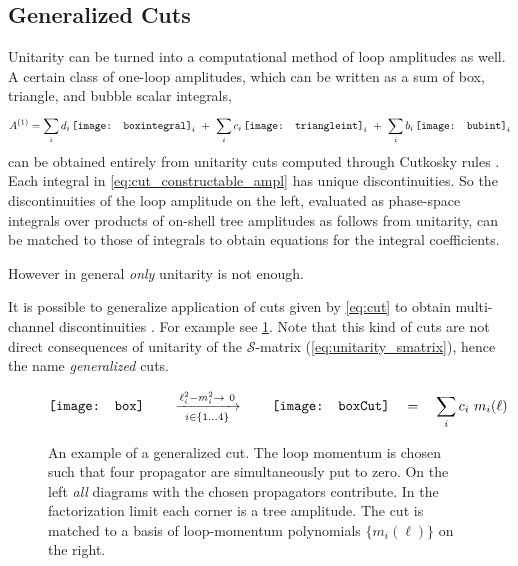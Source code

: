 \subsection{Generalized Cuts}

Unitarity can be turned into a computational method of loop amplitudes as well.
A certain class of one-loop amplitudes, which
can be written as a sum of box, triangle, and bubble scalar integrals,
\begin{equation} \label{eq:cut_constructable_ampl}
  A^{(1)} = \sum_i d_{i}\,\vcenter{\hbox{\texttt{[image: boxintegral]}}}_i~+~
  \sum_{i}^{} c_{i}\,\vcenter{\hbox{\texttt{[image: triangleint]}}}_i~+~
  \sum_i b_{i}\,\vcenter{\hbox{\texttt{[image: bubint]}}}_i
\end{equation}
can be obtained entirely from unitarity cuts computed through Cutkosky rules \cite{Bern:1994cg,Bern:1994zx}.
Each integral in \cref{eq:cut_constructable_ampl} has unique discontinuities.
So the discontinuities of the loop amplitude on the left, 
evaluated as phase-space integrals over products of on-shell tree amplitudes as follows from unitarity,
can be matched to those of integrals to obtain equations for the integral coefficients.

However in general \emph{only} unitarity is not enough.

It is possible to generalize application of cuts given by \cref{eq:cut} to
obtain multi-channel discontinuities \cite{Britto:2004nc}.
For example see \cref{fig:quad_cut}.
Note that this kind of cuts are not direct consequences of unitarity of the $\mathcal{S}$-matrix (\cref{eq:unitarity_smatrix}), hence the name \emph{generalized} cuts.

\begin{figure}[ht]
  \centering
  \begin{equation*}
    \vcenter{\hbox{\texttt{[image: box]}}} \qquad \xrightarrow[i\in\{1\ldots4\}]{\ell_{i}^2-m_i^2\to~0} \qquad
    \vcenter{\hbox{\texttt{[image: boxCut]}}}
    \quad = \quad \sum_{i}  c_{i} ~ m_{i}(\ell) %
  \end{equation*}
  \caption{
    An example of a generalized cut.
    The loop momentum is chosen such that four propagator are simultaneously put to zero.
    On the left \emph{all} diagrams with the chosen propagators contribute.
    In the factorization limit each corner is a tree amplitude.
    The cut is matched to a basis of loop-momentum polynomials $\{m_i(\ell)\}$ on the right.
  }
  \label{fig:quad_cut}
\end{figure}



